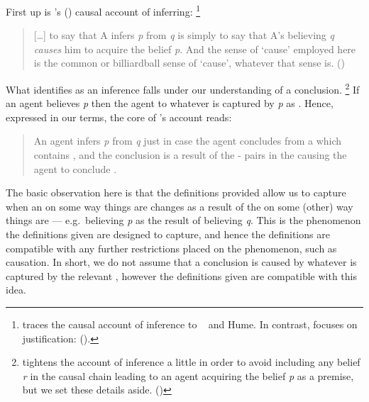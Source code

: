 \begin{note}
  First up is \citeauthor{Armstrong:1968vh}'s (\citeyear{Armstrong:1968vh}) causal account of inferring:%
  \footnote{
    \citeauthor{Armstrong:1968vh} traces the causal account of inference to ~\citeauthor{Moore:1962up} and Hume.
    In contrast, \citeauthor{Frege:1979aa} focuses on justification:  (\citeyear{Frege:1979aa}).
  }
  \begin{quote}
    [\dots] to say that A infers \emph{p} from \emph{q} is simply to say that A's believing \emph{q} \emph{causes} him to acquire the belief \emph{p}.
    And the sense of `cause' employed here is the common or billiardball sense of `cause', whatever that sense is.\newline
    \mbox{}\hfill\mbox{(\citeyear[194]{Armstrong:1968vh})}
  \end{quote}
  What \citeauthor{Armstrong:1968vh} identifies as an inference falls under our understanding of a conclusion.%
  \footnote{
    \citeauthor{Armstrong:1968vh} tightens the account of inference a little in order to avoid including any belief \emph{r} in the causal chain leading to an agent acquiring the belief \emph{p} as a premise, but we set these details aside.
    (\citeyear[195--197]{Armstrong:1968vh})
  }
  If an agent believes \emph{p} then the agent to \eval{} whatever  is captured by \emph{p} as .
  Hence, expressed in our terms, the core of \citeauthor{Armstrong:1968vh}'s account reads:
  \begin{quote}
    An agent infers \emph{p} from \emph{q} just in case the agent concludes  from a \pool{} which contains , and the conclusion is a result of the - pairs in the \pool{} causing the agent to conclude .
  \end{quote}
  The basic observation here is that the definitions provided allow us to capture when an \agpe{} on some way things are changes as a result of the \agpe{} on some (other) way things are --- e.g.\ believing \emph{p} as the result of believing \emph{q}.
  This is the phenomenon the definitions given are designed to capture, and hence the definitions are compatible with any further restrictions placed on the phenomenon, such as causation.
  In short, we do not assume that a conclusion is caused by whatever is captured by the relevant , however the definitions given are compatible with this idea.
\end{note}


